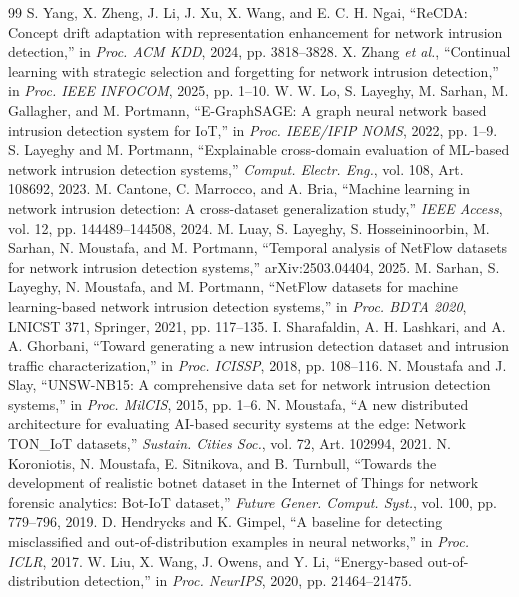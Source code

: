 \documentclass[conference]{IEEEtran}
\begin{document}
\begin{thebibliography}{99}
 S. Yang, X. Zheng, J. Li, J. Xu, X. Wang, and E. C. H. Ngai, ``ReCDA: Concept drift adaptation with representation enhancement for network intrusion detection,'' in \emph{Proc. ACM KDD}, 2024, pp. 3818--3828.
 X. Zhang \emph{et al.}, ``Continual learning with strategic selection and forgetting for network intrusion detection,'' in \emph{Proc. IEEE INFOCOM}, 2025, pp. 1--10.
 W. W. Lo, S. Layeghy, M. Sarhan, M. Gallagher, and M. Portmann, ``E-GraphSAGE: A graph neural network based intrusion detection system for IoT,'' in \emph{Proc. IEEE/IFIP NOMS}, 2022, pp. 1--9.
 S. Layeghy and M. Portmann, ``Explainable cross-domain evaluation of ML-based network intrusion detection systems,'' \emph{Comput. Electr. Eng.}, vol. 108, Art. 108692, 2023.
 M. Cantone, C. Marrocco, and A. Bria, ``Machine learning in network intrusion detection: A cross-dataset generalization study,'' \emph{IEEE Access}, vol. 12, pp. 144489--144508, 2024.
 M. Luay, S. Layeghy, S. Hosseininoorbin, M. Sarhan, N. Moustafa, and M. Portmann, ``Temporal analysis of NetFlow datasets for network intrusion detection systems,'' arXiv:2503.04404, 2025.
 M. Sarhan, S. Layeghy, N. Moustafa, and M. Portmann, ``NetFlow datasets for machine learning-based network intrusion detection systems,'' in \emph{Proc. BDTA 2020}, LNICST 371, Springer, 2021, pp. 117--135.
 I. Sharafaldin, A. H. Lashkari, and A. A. Ghorbani, ``Toward generating a new intrusion detection dataset and intrusion traffic characterization,'' in \emph{Proc. ICISSP}, 2018, pp. 108--116.
 N. Moustafa and J. Slay, ``UNSW-NB15: A comprehensive data set for network intrusion detection systems,'' in \emph{Proc. MilCIS}, 2015, pp. 1--6.
 N. Moustafa, ``A new distributed architecture for evaluating AI-based security systems at the edge: Network TON\_IoT datasets,'' \emph{Sustain. Cities Soc.}, vol. 72, Art. 102994, 2021.
 N. Koroniotis, N. Moustafa, E. Sitnikova, and B. Turnbull, ``Towards the development of realistic botnet dataset in the Internet of Things for network forensic analytics: Bot-IoT dataset,'' \emph{Future Gener. Comput. Syst.}, vol. 100, pp. 779--796, 2019.
 D. Hendrycks and K. Gimpel, ``A baseline for detecting misclassified and out-of-distribution examples in neural networks,'' in \emph{Proc. ICLR}, 2017.
 W. Liu, X. Wang, J. Owens, and Y. Li, ``Energy-based out-of-distribution detection,'' in \emph{Proc. NeurIPS}, 2020, pp. 21464--21475.

\end{thebibliography}
\end{document}
